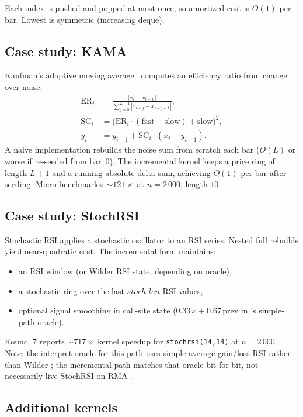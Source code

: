 \documentclass[11pt,a4paper]{article}
\begin{document}
Each index is pushed and popped at most once, so amortized cost is $O(1)$ per
bar.  Lowest is symmetric (increasing deque).

\subsection{Case study: KAMA}
\label{sec:inc-kama}

Kaufman's adaptive moving average~\citep{kama1998kaufman} computes an
efficiency ratio from change over noise:
\begin{align}
  \mathrm{ER}_i &= \frac{|x_i-x_{i-L}|}{\sum_{j=0}^{L-1}|x_{i-j}-x_{i-j-1}|}, \\
  \mathrm{SC}_i &= \big(\mathrm{ER}_i\cdot(\mathrm{fast}-\mathrm{slow})+\mathrm{slow}\big)^2, \\
  y_i &= y_{i-1} + \mathrm{SC}_i\cdot(x_i-y_{i-1}).
\end{align}
A naive implementation rebuilds the noise sum from scratch each bar
($O(L)$ or worse if re-seeded from bar~$0$).  The incremental kernel keeps a
price ring of length $L{+}1$ and a running absolute-delta sum, achieving
$O(1)$ per bar after seeding.  Micro-benchmarks: $\sim 121\times$ at
$n=2\,000$, length $10$.

\subsection{Case study: StochRSI}
\label{sec:inc-stochrsi}

Stochastic RSI applies a stochastic oscillator to an RSI series.  Nested
full rebuilds yield near-quadratic cost.  The incremental form maintains:
\begin{itemize}[leftmargin=*]
  \item an RSI window (or Wilder RSI state, depending on oracle),
  \item a stochastic ring over the last $\mathit{stoch\_len}$ RSI values,
  \item optional signal smoothing in call-site state
        ($0.33\,x+0.67\,\mathrm{prev}$ in \pyne{}'s simple-path oracle).
\end{itemize}
Round~7 reports $\sim 717\times$ kernel speedup for
\texttt{stochrsi(14,14)} at $n=2\,000$.  Note: the interpret oracle for this
path uses simple average gain/loss RSI rather than Wilder ; the
incremental path matches that oracle bit-for-bit, not necessarily live \tv{}
StochRSI-on-RMA~\citep{pynescript2026}.

\subsection{Additional kernels}
\end{document}

